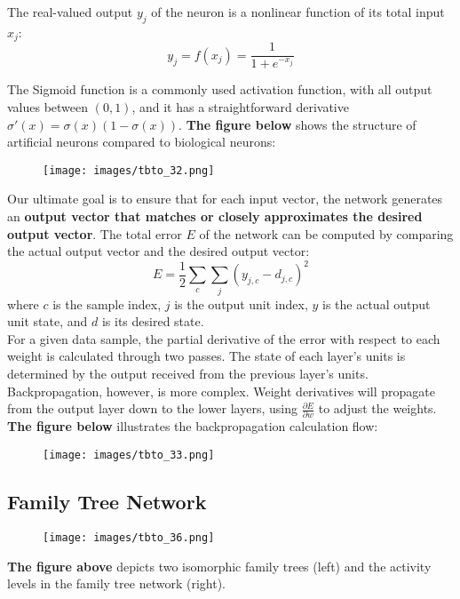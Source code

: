 \documentclass[11p,oneside]{book}
\begin{document}
The real-valued output $y_j$ of the neuron is a nonlinear function of its total input $x_j$:
$$
y_j = f(x_j) = \frac{1}{1 + e^{-x_j}}
$$

The Sigmoid function is a commonly used activation function, with all output values between $(0, 1)$, and it has a straightforward derivative $\sigma'(x) = \sigma(x)(1 - \sigma(x))$. \textbf{The figure below} shows the structure of artificial neurons compared to biological neurons:

\begin{figure}[H]
    \centering
    \texttt{[image: images/tbto\_32.png]}
\end{figure}

Our ultimate goal is to ensure that for each input vector, the network generates an \textbf{output vector that matches or closely approximates the desired output vector}. The total error $E$ of the network can be computed by comparing the actual output vector and the desired output vector:
$$
E = \frac{1}{2} \sum_c \sum_j (y_{j,c} - d_{j,c})^2
$$
where $c$ is the sample index, $j$ is the output unit index, $y$ is the actual output unit state, and $d$ is its desired state. \\

For a given data sample, the partial derivative of the error with respect to each weight is calculated through two passes. The state of each layer's units is determined by the output received from the previous layer’s units. Backpropagation, however, is more complex. Weight derivatives will propagate from the output layer down to the lower layers, using $\frac{\partial E}{\partial w}$ to adjust the weights. \textbf{The figure below} illustrates the backpropagation calculation flow:

\begin{figure}[H]
    \centering
    \texttt{[image: images/tbto\_33.png]}
\end{figure}

\subsection*{Family Tree Network}

\begin{figure}[H]
    \centering
    \texttt{[image: images/tbto\_36.png]}
\end{figure}

\textbf{The figure above} depicts two isomorphic family trees (left) and the activity levels in the family tree network (right). \\
\end{document}
